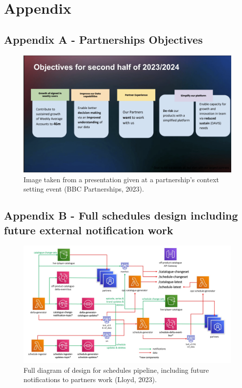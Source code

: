 \section{Appendix}

  \subsection{Appendix A - Partnerships Objectives}
    \label{sec:AppendixA}
    \begin{figure}[H]
      \centering
      \includegraphics[width=12cm]{assets/appendix/partnershipsObjectives.png}
      \caption{Image taken from a presentation given at a partnership's context setting event (BBC Partnerships, 2023).}
      \label{fig:partnershipsObjectives}
    \end{figure}

  \newpage
  \subsection{Appendix B - Full schedules design including future external notification work}
    \label{sec:AppendixB}
    \begin{figure}[H]
      \centering
      \includegraphics[width=12cm]{assets/appendix/initialDesign.jpg}
      \caption{Full diagram of design for schedules pipeline, including future notifications to partners work (Lloyd, 2023).}
      \label{fig:fullSpikeDesign}
    \end{figure}


